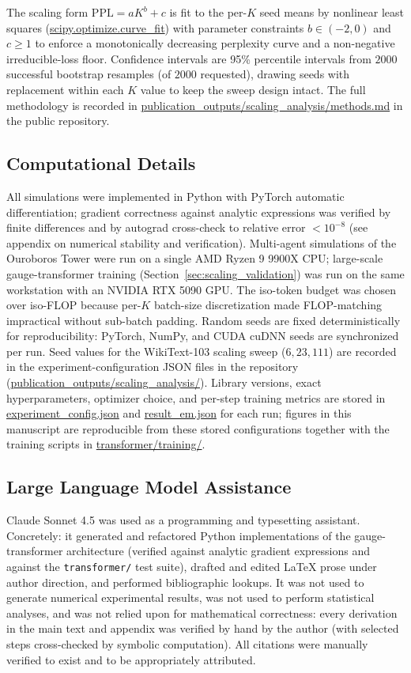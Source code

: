 \documentclass[11pt]{article}
\begin{document}
The scaling form $\mathrm{PPL} = aK^b + c$ is fit to the per-$K$ seed means by nonlinear least squares (\url{scipy.optimize.curve_fit}) with parameter constraints $b \in (-2, 0)$ and $c \geq 1$ to enforce a monotonically decreasing perplexity curve and a non-negative irreducible-loss floor. Confidence intervals are 95\% percentile intervals from $2000$ successful bootstrap resamples (of $2000$ requested), drawing seeds with replacement within each $K$ value to keep the sweep design intact. The full methodology is recorded in \url{publication_outputs/scaling_analysis/methods.md} in the public repository.

\subsection{Computational Details}
All simulations were implemented in Python with PyTorch automatic differentiation; gradient correctness against analytic expressions was verified by finite differences and by autograd cross-check to relative error $<10^{-8}$ (see appendix on numerical stability and verification). Multi-agent simulations of the Ouroboros Tower were run on a single AMD Ryzen 9 9900X CPU; large-scale gauge-transformer training (Section~\ref{sec:scaling_validation}) was run on the same workstation with an NVIDIA RTX 5090 GPU. The iso-token budget was chosen over iso-FLOP because per-$K$ batch-size discretization made FLOP-matching impractical without sub-batch padding. Random seeds are fixed deterministically for reproducibility: PyTorch, NumPy, and CUDA cuDNN seeds are synchronized per run. Seed values for the WikiText-103 scaling sweep ($6, 23, 111$) are recorded in the experiment-configuration JSON files in the repository (\url{publication_outputs/scaling_analysis/}). Library versions, exact hyperparameters, optimizer choice, and per-step training metrics are stored in \url{experiment_config.json} and \url{result_em.json} for each run; figures in this manuscript are reproducible from these stored configurations together with the training scripts in \url{transformer/training/}.

\subsection{Large Language Model Assistance}
Claude Sonnet 4.5 was used as a programming and typesetting assistant. Concretely: it generated and refactored Python implementations of the gauge-transformer architecture (verified against analytic gradient expressions and against the \texttt{transformer/} test suite), drafted and edited LaTeX prose under author direction, and performed bibliographic lookups. It was not used to generate numerical experimental results, was not used to perform statistical analyses, and was not relied upon for mathematical correctness: every derivation in the main text and appendix was verified by hand by the author (with selected steps cross-checked by symbolic computation). All citations were manually verified to exist and to be appropriately attributed.
\end{document}
